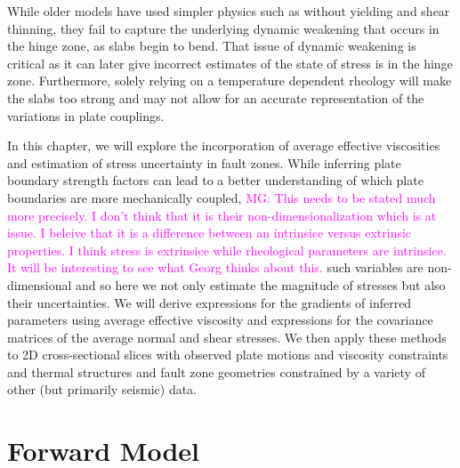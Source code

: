 \documentclass[12pt]{article}
\newcommand{\mgnote}[1]{\textcolor{magenta}{MG: #1}}
\begin{document}
While older models have used simpler physics such as without yielding and shear thinning, they fail to capture the underlying dynamic weakening that occurs in the hinge zone, as slabs begin to bend. That issue of dynamic weakening is critical as it can later give incorrect estimates of the state of stress is in the hinge zone. Furthermore, solely relying on a temperature dependent rheology will make the slabs too strong and may not allow for an accurate representation of the variations in plate couplings. 


In this chapter, we will explore the incorporation of average effective viscosities and estimation of stress uncertainty in fault zones. While inferring plate boundary strength factors \citep{ratnaswamy2015adjoint} can lead to a better understanding of which plate boundaries are more mechanically coupled, \mgnote{This needs to be stated much more precisely. I don't think that it is their non-dimensionalization which is at issue. I beleive that it is a difference between an intrinsice versus extrinsic properties. I think stress is extrinsice while rheological parameters are intrinsice. It will be interesting to see what Georg thinks about this.} such variables are non-dimensional and so here we not only estimate the magnitude of  stresses but also their uncertainties. We will derive expressions for the gradients of inferred parameters using average effective viscosity and expressions for the covariance matrices of the average normal and shear stresses. We then apply these methods to 2D cross-sectional slices with observed plate motions and viscosity constraints and thermal structures and fault zone geometries constrained by a variety of other (but primarily seismic) data.
 
\section{Forward Model}
\end{document}
